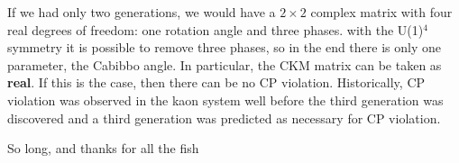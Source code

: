 \documentclass[../main.tex]{subfiles}
\begin{document}
If we had only two generations, we would have a $2\times2$ complex matrix with four real degrees of freedom: one rotation angle and three phases. with the U(1)$^4$ symmetry it is possible to remove three phases, so in the end there is only one parameter, the Cabibbo angle. In particular, the CKM matrix can be taken as \textbf{real}. If this is the case, then there can be no CP violation. Historically, CP violation was observed in the kaon system well before the third generation was discovered and a third generation was predicted as necessary for CP violation. 
\newpage
\vspace*{\fill}
\begin{center}
\begin{minipage}{\textwidth}
So long, and thanks for all the fish
\end{minipage}
\end{center}
\vfill %
\end{document}
